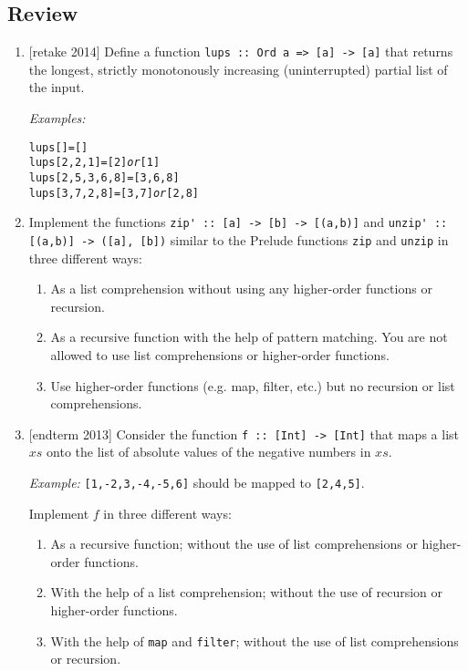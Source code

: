 \documentclass{article}
\def\code#1{\texttt{#1}}
\begin{document}
\subsection{Review}
\begin{enumerate}
\item {[retake 2014]} Define a function \code{lups :: Ord a => [a] -> [a]} that returns the longest, strictly monotonously increasing (uninterrupted) partial list of the input. \par
\textit{Examples:}
\begin{alltt}
    lups [] = []
    lups [2 ,2 ,1] = [2] \textit{or} [1]
    lups [2 ,5 ,3 ,6 ,8] = [3 ,6 ,8]
    lups [3 ,7 ,2 ,8] = [3 ,7] \textit{or} [2 ,8]
\end{alltt}

\item Implement the functions \verb|zip' :: [a] -> [b] -> [(a,b)]| and \verb|unzip' :: [(a,b)] -> ([a], [b])| similar to the Prelude functions \verb|zip| and \verb|unzip| in three different ways:
\begin{enumerate}
\item As a list comprehension without using any higher-order functions or recursion.
\item As a recursive function with the help of pattern matching. You are not allowed to use list comprehensions or higher-order functions.
\item Use higher-order functions (e.g. map, filter, etc.) but no recursion or list comprehensions.
\end{enumerate}

\item {[endterm 2013]} Consider the function \verb|f :: [Int] -> [Int]| that maps a list $xs$ onto the list of absolute values of the negative numbers in $xs$. \par
\textit{Example:} \verb|[1,-2,3,-4,-5,6]| should be mapped to \verb|[2,4,5]|. \par
Implement $f$ in three different ways:
\begin{enumerate}
\item As a recursive function; without the use of list comprehensions or higher-order functions.
\item With the help of a list comprehension; without the use of recursion or higher-order functions.
\item With the help of \verb|map| and \verb|filter|; without the use of list comprehensions or recursion.
\end{enumerate}
\end{enumerate}

\printbibliography
\end{document}
